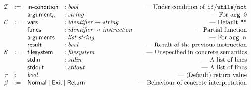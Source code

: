 \documentclass{scrartcl}
\newcommand{\inp}{\mathcal I}
\newcommand{\ctx}{\mathcal C}
\newcommand{\sta}{\mathcal S}
\newcommand{\bnormal}{\textsf{Normal}}
\newcommand{\breturn}{\textsf{Return}}
\newcommand{\bexit}{\textsf{Exit}}
\newcommand{\mathcomment}[1]{\text{--- #1}}
\begin{document}
\[
\begin{array}{rlllr}
  \inp  &:= & \textsf{in-condition}                                  &: \textit{bool}                                         & \mathcomment{Under condition of \texttt{if}/\texttt{while}/\texttt{not}}\\
        &   & \textsf{argument}_0                                    &: \textit{string}                                       & \mathcomment{For \texttt{arg 0}}\\
  \ctx  &:= &\textsf{vars}                                           &: \textit{identifier} \rightarrow \textit{string}       & \mathcomment{Default \texttt{""}} \\
        &   &\textsf{funcs}                                          &: \textit{identifier} \nrightarrow \textit{instruction} & \mathcomment{Partial function} \\
        &   &\textsf{arguments}                                      &: \textit{list}\ \textit{string}                        & \mathcomment{For \texttt{arg \emph{n}}}\\
        &   &\textsf{result}                                         &: \textit{bool}                                         & \mathcomment{Result of the previous instruction} \\
  \sta  &:= &\textsf{filesystem}                                     &: \textit{filesystem}                                   & \mathcomment{Unspecified in concrete semantics} \\
        &   &\textsf{stdin}                                          &: \textit{stdin}                                        & \mathcomment{A list of lines} \\
        &   &\textsf{stdout}                                         &: \textit{stdout}                                       & \mathcomment{A list of lines} \\
  r     &:  & \textit{bool}                                          &                                                        &\mathcomment{(Default) return value}\\
  \beta &:= & \multicolumn{2}{l}{\bnormal \mid \bexit \mid \breturn} & \mathcomment{Behaviour of concrete interpretation}\\ \end{array}
\]
\end{document}
